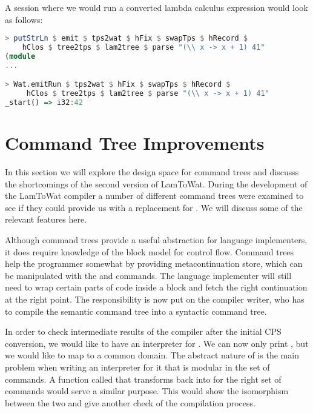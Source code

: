 A  session where we would run a converted lambda calculus expression would look as follows:

\begin{lstlisting}[language=Haskell]
> putStrLn $ emit $ tps2wat $ hFix $ swapTps $ hRecord $
    hClos $ tree2tps $ lam2tree $ parse "(\\ x -> x + 1) 41"
(module
...

> Wat.emitRun $ tps2wat $ hFix $ swapTps $ hRecord $
     hClos $ tree2tps $ lam2tree $ parse "(\\ x -> x + 1) 41"
_start() => i32:42
\end{lstlisting}

\section{\label{section:ctreebetter}Command Tree Improvements}
In this section we will explore the design space for command trees and discusss the shortcomings of the second version of LamToWat. During the development of the LamToWat compiler a number of different command trees were examined to see if they could provide us with a replacement for . We will discuss some of the relevant features here.

Although command trees provide a useful abstraction for language implementers, it does require knowledge of the block model for control flow. Command trees help the programmer somewhat by providing metacontinuation store, which can be manipulated with the  and  commands. The language implementer will still need to wrap certain parts of code inside a block and fetch the right continuation at the right point. The responsibility is now put on the compiler writer, who has to compile the semantic command tree into a syntactic command tree.

In order to check intermediate results of the compiler after the initial CPS conversion, we would like to have an interpreter for . We can now only print , but we would like to map  to a common domain. The abstract nature of  is the main problem when writing an interpreter for it that is modular in the set of commands. A function called  that transforms  back into  for the right set of commands would serve a similar purpose. This would show the isomorphism between the two and give another check of the compilation process.

